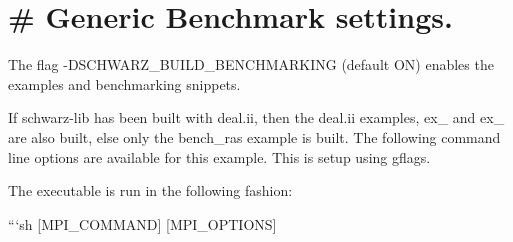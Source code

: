 \section*{\# Generic Benchmark settings. }

The flag {\ttfamily -\/\+D\+S\+C\+H\+W\+A\+R\+Z\+\_\+\+B\+U\+I\+L\+D\+\_\+\+B\+E\+N\+C\+H\+M\+A\+R\+K\+I\+NG} (default {\ttfamily ON}) enables the examples and benchmarking snippets.

If {\ttfamily schwarz-\/lib} has been built with {\ttfamily deal.\+ii}, then the {\ttfamily deal.\+ii} examples, {\ttfamily ex\+\_} and {\ttfamily ex\+\_} are also built, else only the {\ttfamily bench\+\_\+ras} example is built. The following command line options are available for this example. This is setup using {\ttfamily gflags}.

The executable is run in the following fashion\+:

```sh \mbox{[}M\+P\+I\+\_\+\+C\+O\+M\+M\+A\+ND\mbox{]} \mbox{[}M\+P\+I\+\_\+\+O\+P\+T\+I\+O\+NS\mbox{]} 